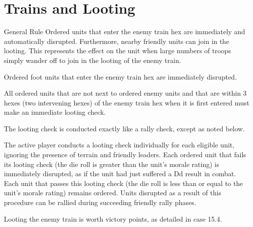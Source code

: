 \section{Trains and Looting}

\begin{rulebox}{General Rule}
Ordered units that enter the enemy train hex are immediately and automatically disrupted. Furthermore, nearby friendly units can join in the looting. This represents the effect on the unit when large numbers of troops simply wander off to join in the looting of the enemy train.
\end{rulebox}

 Ordered foot units that enter the enemy train hex are immediately disrupted.

 All ordered units that are not next to ordered enemy units and that are within 3 hexes (two intervening hexes) of the enemy train hex when it is first entered must make an immediate looting check.

 The looting check is conducted exactly like a rally check, except as noted below.

The active player conducts a looting check individually for each eligible unit, ignoring the presence of terrain and friendly leaders. Each ordered unit that fails its looting check (the die roll is greater than the unit's morale rating) is immediately disrupted, as if the unit had just suffered a Dd result in combat. Each unit that passes this looting check (the die roll is less than or equal to the unit's morale rating) remains ordered. Units disrupted as a result of this procedure can be rallied during succeeding friendly rally phases.

 Looting the enemy train is worth victory points, as detailed in case 15.4.
